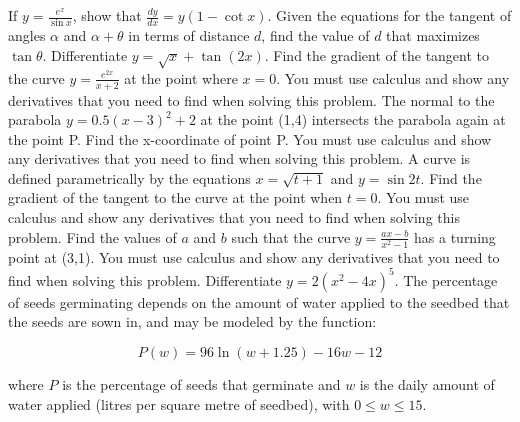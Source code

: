 \documentclass[12pt,addpoints]{exam}
\begin{document}
\begin{questions}
\fillwithlines{3cm}
\question[5] If \( y = \frac{e^x}{\sin x} \), show that \(\frac{dy}{dx} = y(1 - \cot x)\).
\fillwithlines{3cm}
\question[5] Given the equations for the tangent of angles \(\alpha\) and \(\alpha + \theta\) in terms of distance \(d\), find the value of \(d\) that maximizes \(\tan \theta\).
\fillwithlines{3cm}
\question[5] Differentiate \( y = \sqrt{x} + \tan(2x) \).
\fillwithlines{3cm}
\question[5] Find the gradient of the tangent to the curve \( y = \frac{e^{2x}}{x+2} \) at the point where \( x = 0 \). You must use calculus and show any derivatives that you need to find when solving this problem.
\fillwithlines{3cm}
\question[5] The normal to the parabola \( y = 0.5(x - 3)^2 + 2 \) at the point (1,4) intersects the parabola again at the point P. Find the x-coordinate of point P. You must use calculus and show any derivatives that you need to find when solving this problem.
\fillwithlines{3cm}
\question[5] A curve is defined parametrically by the equations \( x = \sqrt{t+1} \) and \( y = \sin 2t \). Find the gradient of the tangent to the curve at the point when \( t = 0 \). You must use calculus and show any derivatives that you need to find when solving this problem.
\fillwithlines{3cm}
\question[5] Find the values of \( a \) and \( b \) such that the curve \( y = \frac{ax - b}{x^2 - 1} \) has a turning point at (3,1). You must use calculus and show any derivatives that you need to find when solving this problem.
\fillwithlines{3cm}
\question[5] Differentiate \( y = 2(x^2 - 4x)^5 \).
\fillwithlines{3cm}
\question[5] The percentage of seeds germinating depends on the amount of water applied to the seedbed that the seeds are sown in, and may be modeled by the function:

\[ P(w) = 96 \ln(w + 1.25) - 16w - 12 \]

where \( P \) is the percentage of seeds that germinate and \( w \) is the daily amount of water applied (litres per square metre of seedbed), with \( 0 \leq w \leq 15 \).


\end{questions}
\end{document}
